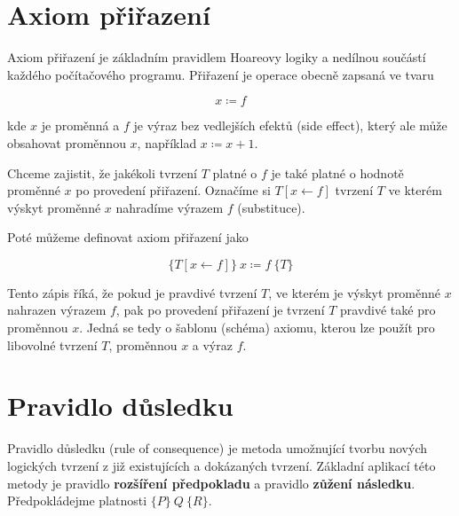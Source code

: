 
\section{Axiom přiřazení}
\label{sec:hoare-axiom-prirazeni}

Axiom přiřazení je základním pravidlem Hoareovy logiky a nedílnou součástí každého počítačového programu.
Přiřazení je operace obecně zapsaná ve tvaru

\begin{equation*}
    x \coloneqq f
\end{equation*}

kde $x$ je proměnná a $f$ je výraz bez vedlejších efektů (side effect),
který ale může obsahovat proměnnou $x$, například $x \coloneqq x + 1$.

Chceme zajistit, že jakékoli tvrzení $T$ platné o $f$
je také platné o hodnotě proměnné $x$ po provedení přiřazení.
Označíme si $T[x \leftarrow f]$ tvrzení $T$ ve kterém výskyt proměnné $x$ nahradíme výrazem $f$ (substituce).

Poté můžeme definovat axiom přiřazení jako

\begin{equation*}
    \{ T[x \leftarrow f] \} \  x \coloneqq f \  \{ T \}
\end{equation*}

Tento zápis říká, že pokud je pravdivé tvrzení $T$, ve kterém
je výskyt proměnné $x$ nahrazen výrazem $f$, pak po provedení přiřazení
je tvrzení $T$ pravdivé také pro proměnnou $x$.
Jedná se tedy o šablonu (schéma) axiomu,
kterou lze použít pro libovolné tvrzení $T$, proměnnou $x$ a výraz $f$.


\section{Pravidlo důsledku}
\label{sec:hoare-pravidlo-dusledku}

Pravidlo důsledku (rule of consequence) je metoda umožnující
tvorbu nových logických tvrzení z již existujících a dokázaných tvrzení.
Základní aplikací této metody je pravidlo \textbf{rozšíření předpokladu}
a pravidlo \textbf{zůžení následku}.
Předpokládejme platnosti $\{ P \} \  Q \  \{ R \}$.

